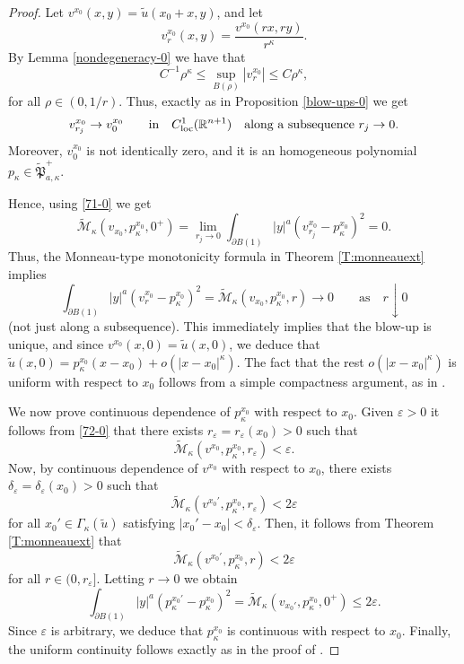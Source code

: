 \documentclass[11pt]{amsart}
\theoremstyle{plain}
\numberwithin{equation}{section}
\begin{document}
\begin{proof}
Let $v^{x_0}(x,y)=\tilde u(x_0+x,y)$, and let
\[v_r^{x_0}(x,y)=\frac{v^{x_0}(rx,ry)}{r^\kappa}.\]
By Lemma \ref{nondegeneracy-0} we have that
\[C^{-1}\rho^\kappa\leq \sup_{B(\rho)}|v_r^{x_0}|\leq C\rho^\kappa,\]
for all $\rho\in (0,1/r)$.
Thus, exactly as in Proposition \ref{blow-ups-0} we get
\begin{equation}\label{71-0}
v_{r_j}^{x_0}\rightarrow v_0^{x_0}\qquad\textrm{in}\quad C^1_{\rm loc}({\mathbb R}^{n+1})\quad \textrm{along a subsequence}\ r_j\to0.
\end{equation}
Moreover, $v_0^{x_0}$ is not identically zero, and it is an homogeneous polynomial $p_\kappa\in\tilde{\mathfrak P}_{a,\kappa}^+$.

Hence, using \eqref{71-0} we get
\[\tilde{\mathcal M}_\kappa(v_{x_0},p_\kappa^{x_0},0^+) =\lim_{r_j\to0}\int_{\partial B(1)}|y|^a(v_{r_j}^{x_0}-p_\kappa^{x_0})^2=0.\]
Thus, the Monneau-type monotonicity formula in Theorem \ref{T:monneauext} implies
\begin{equation}\label{72-0}
\int_{\partial B(1)}|y|^a(v_r^{x_0}-p_\kappa^{x_0})^2=\tilde{\mathcal M}_\kappa(v_{x_0},p_\kappa^{x_0},r)\longrightarrow0\qquad \textrm{as}\quad r\downarrow0
\end{equation}
(not just along a subsequence).
This immediately implies that the blow-up is unique, and since $v^{x_0}(x,0)=\tilde u(x,0)$, we deduce that $\tilde u(x,0)=p_\kappa^{x_0}(x-x_0)+o(|x-x_0|^\kappa)$.
The fact that the rest $o(|x-x_0|^\kappa)$ is uniform with respect to $x_0$ follows from a simple compactness argument, as in \cite[Lemma 7.3 and Proposition 7.7]{PSU}.

We now prove continuous dependence of $p_\kappa^{x_0}$ with respect to $x_0$.
Given $\varepsilon>0$ it follows from \eqref{72-0} that there exists $r_\varepsilon=r_\varepsilon(x_0)>0$ such that
\[\tilde{\mathcal M}_\kappa(v^{x_0},p_\kappa^{x_0},r_\varepsilon)<\varepsilon.\]
Now, by continuous dependence of $v^{x_0}$ with respect to $x_0$, there exists $\delta_\varepsilon=\delta_\varepsilon(x_0)>0$ such that
\[\tilde{\mathcal M}_\kappa(v^{x_0'},p_\kappa^{x_0},r_\varepsilon)<2\varepsilon\]
for all $x_0'\in \Gamma_\kappa(\tilde u)$ satisfying $|x_0'-x_0|<\delta_\varepsilon$.
Then, it follows from Theorem \ref{T:monneauext} that
\[\tilde{\mathcal M}_\kappa(v^{x_0'},p_\kappa^{x_0},r)<2\varepsilon\]
for all $r\in(0,r_\varepsilon]$.
Letting $r\to0$ we obtain
\[\int_{\partial B(1)}|y|^a(p_\kappa^{x_0'}-p_\kappa^{x_0})^2=\tilde{\mathcal M}_\kappa(v_{x_0'},p_\kappa^{x_0},0^+)\leq 2\varepsilon.\]
Since $\varepsilon$ is arbitrary, we deduce that $p_\kappa^{x_0}$ is continuous with respect to $x_0$.
Finally, the uniform continuity follows exactly as in the proof of \cite[Theorem 1.5.4]{GP}.
\end{proof}
\end{document}
